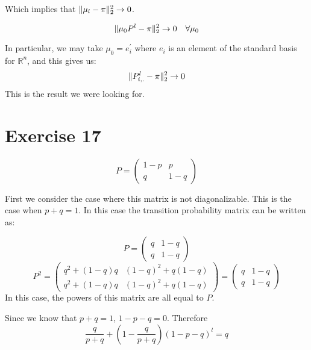 \documentclass[12pt]{paper}
\newcommand{\setR}{ \mathbb{R} }
\DeclarePairedDelimiter{\norm}{\lVert}{\rVert}
\begin{document}
Which implies that $\norm{\mu_l - \pi}_2^2 \rightarrow 0$.

\begin{equation*}
  \norm{\mu_0 P^l - \pi }_2^2 \rightarrow 0 \quad \forall\mu_0 
\end{equation*}

In particular, we may take $\mu_0 = e_i^{\prime}$ where $e_i$ is an element of
the standard basis for $\setR^n$, and this gives us:
\begin{equation*}
  \norm{P^l_{i,.} - \pi}_2^2 \rightarrow 0
\end{equation*}
This is the result we were looking for.




\section{Exercise 17}

\begin{equation*}
  P =
  \begin{pmatrix}
    1 - p & p\\
    q & 1-q
  \end{pmatrix}
\end{equation*}
 
First we consider the case where this matrix is not
diagonalizable. This is the case when $p+q = 1$. In this case the
transition probability matrix can be written as:

\begin{equation*}
  P =
  \begin{pmatrix}
    q & 1 - q\\
    q & 1 - q 
  \end{pmatrix}    
\end{equation*}
\begin{equation*}
  P^2 =
  \begin{pmatrix}
    q^2 + (1-q)q & (1-q)^2 + q(1-q)\\
    q^2 + (1-q)q & (1-q)^2 + q(1-q)
  \end{pmatrix} =
  \begin{pmatrix}
    q & 1 - q\\
    q & 1 - q
  \end{pmatrix}
\end{equation*}
In this case, the powers of this matrix are all equal to $P$.

Since we know that $p+q=1$, $1-p-q = 0$. Therefore
\begin{equation*}
  \frac{q}{p+q} + \left(1-\frac{q}{p+q}\right)(1-p-q)^l = q
\end{equation*}
\end{document}
